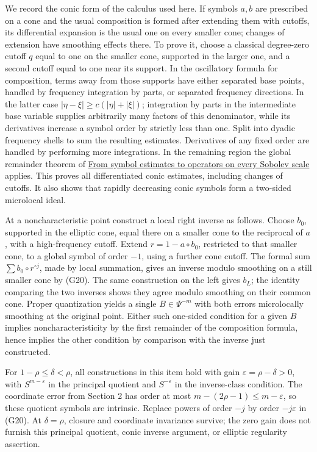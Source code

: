 \documentclass[
  11pt,
]{article}
\begin{document}
We record the conic form of the calculus used here. If symbols \(a,b\)
are prescribed on a cone and the usual composition is formed after
extending them with cutoffs, its differential expansion is the usual one
on every smaller cone; changes of extension have smoothing effects
there. To prove it, choose a classical degree-zero cutoff \(q\) equal to
one on the smaller cone, supported in the larger one, and a second
cutoff equal to one near its support. In the oscillatory formula for
composition, terms away from those supports have either separated base
points, handled by frequency integration by parts, or separated
frequency directions. In the latter case
\(|\eta-\xi|\geq c(|\eta|+|\xi|)\); integration by parts in the
intermediate base variable supplies arbitrarily many factors of this
denominator, while its derivatives increase a symbol order by strictly
less than one. Split into dyadic frequency shells to sum the resulting
estimates. Derivatives of any fixed order are handled by performing more
integrations. In the remaining region the global remainder theorem of
\href{euclidean-symbol-calculus.pdf}{From symbol estimates to operators
on every Sobolev scale} applies. This proves all differentiated conic
estimates, including changes of cutoffs. It also shows that rapidly
decreasing conic symbols form a two-sided microlocal ideal.

At a noncharacteristic point construct a local right inverse as follows.
Choose \(b_0\), supported in the elliptic cone, equal there on a smaller
cone to the reciprocal of \(a\), with a high-frequency cutoff. Extend
\(r=1-a\circ b_0\), restricted to that smaller cone, to a global symbol
of order \(-1\), using a further cone cutoff. The formal sum
\(\sum b_0\circ r^{\circ j}\), made by local summation, gives an inverse
modulo smoothing on a still smaller cone by (G20). The same construction
on the left gives \(b_L\); the identity comparing the two inverses shows
they agree modulo smoothing on their common cone. Proper quantization
yields a single \(B\in\Psi^{-m}\) with both errors microlocally
smoothing at the original point. Either such one-sided condition for a
given \(B\) implies noncharacteristicity by the first remainder of the
composition formula, hence implies the other condition by comparison
with the inverse just constructed.

For \(1-\rho\leq\delta<\rho\), all constructions in this item hold with
gain \(\varepsilon=\rho-\delta>0\), with \(S^{m-\varepsilon}\) in the
principal quotient and \(S^{-\varepsilon}\) in the inverse-class
condition. The coordinate error from Section 2 has order at most
\(m-(2\rho-1)\leq m-\varepsilon\), so these quotient symbols are
intrinsic. Replace powers of order \(-j\) by order \(-j\varepsilon\) in
(G20). At \(\delta=\rho\), closure and coordinate invariance survive;
the zero gain does not furnish this principal quotient, conic inverse
argument, or elliptic regularity assertion.
\end{document}
